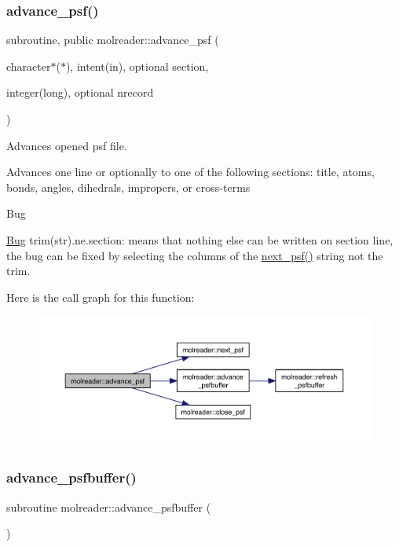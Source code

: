 \subsubsection{\texorpdfstring{advance\+\_\+psf()}{advance\_psf()}}
{\footnotesize\ttfamily subroutine, public molreader\+::advance\+\_\+psf (\begin{DoxyParamCaption}\item[{character$\ast$($\ast$), intent(in), optional}]{section,  }\item[{integer(long), optional}]{nrecord }\end{DoxyParamCaption})}



Advances opened psf file. 

Advances one line or optionally to one of the following sections\+: title, atoms, bonds, angles, dihedrals, impropers, or cross-\/terms \begin{DoxyRefDesc}{Bug}
\item[\hyperlink{bug__bug000002}{Bug}]trim(str).ne.\textquotesingle{}section\textquotesingle{}\+: means that nothing else can be written on section line, the bug can be fixed by selecting the columns of the \hyperlink{namespacemolreader_ac6b85a406b7ebd0810f0d63beeeda783}{next\+\_\+psf()} string not the trim. \end{DoxyRefDesc}
Here is the call graph for this function\+:\nopagebreak
\begin{figure}[H]
\begin{center}
\leavevmode
\includegraphics[width=350pt]{namespacemolreader_a7a4cb6436916cd4b8ee0341d528e9c73_cgraph}
\end{center}
\end{figure}
\mbox{\label{namespacemolreader_abf243c87d2f9429f3ed94293d438c7c7}} 
\subsubsection{\texorpdfstring{advance\+\_\+psfbuffer()}{advance\_psfbuffer()}}
{\footnotesize\ttfamily subroutine molreader\+::advance\+\_\+psfbuffer (\begin{DoxyParamCaption}{ }\end{DoxyParamCaption})\hspace{0.3cm}{\ttfamily [private]}}


